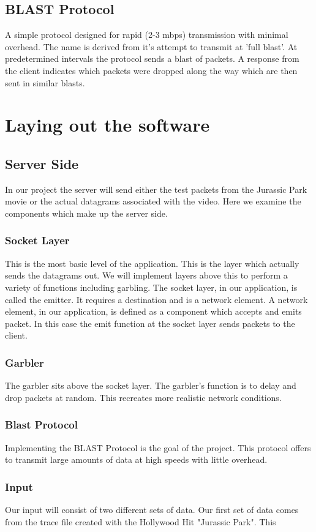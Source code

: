 \documentclass[twocolumn,nofootinbib,%
notitlepage,11pt]{report}
\begin{document}
\subsection*{BLAST Protocol}
A simple protocol designed for rapid (2-3 mbps) transmission with minimal overhead. The name is derived from it's attempt to transmit at 'full blast'. At predetermined intervals the protocol sends a blast of packets. A response from the client indicates which packets were dropped along the way which are then sent in similar blasts.\cite{professor}

\section*{Laying out the software}
\subsection*{Server Side}
In our project the server will send either the test packets from the Jurassic Park movie or the actual datagrams associated with the video. Here we examine the components which make up the server side.
\subsubsection*{Socket Layer}
This is the most basic level of the application. This is the layer which actually sends the datagrams out. We will implement layers above this to perform a variety of functions including garbling. The socket layer, in our application, is called the emitter. It requires a destination and is a network element. A network element, in our application, is defined as a component which accepts and emits packet. In this case the emit function at the socket layer sends packets to the client.
\subsubsection*{Garbler}
The garbler sits above the socket layer. The garbler's function is to delay and drop packets at random. This recreates more realistic network conditions.
\subsubsection*{Blast Protocol}
Implementing the BLAST Protocol is the goal of the project. This protocol offers to transmit large amounts of data at high speeds with little overhead. 
\subsubsection*{Input}
Our input will consist of two different sets of data. Our first set of data comes from the trace file created with the Hollywood Hit "Jurassic Park". This
\end{document}
